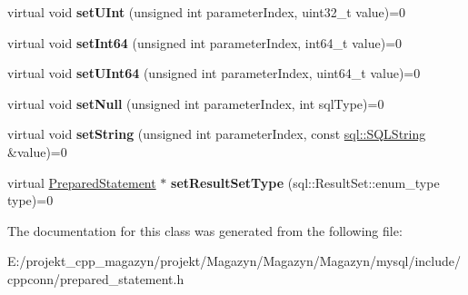 \begin{DoxyCompactItemize}
virtual void {\bfseries set\+U\+Int} (unsigned int parameter\+Index, uint32\+\_\+t value)=0
\item 
\hypertarget{classsql_1_1_prepared_statement_a9c543a18f0e53d669803aab8e84542bd}{}\label{classsql_1_1_prepared_statement_a9c543a18f0e53d669803aab8e84542bd} 
virtual void {\bfseries set\+Int64} (unsigned int parameter\+Index, int64\+\_\+t value)=0
\item 
\hypertarget{classsql_1_1_prepared_statement_a2199c99e837a43a4f2cea85a534c01dd}{}\label{classsql_1_1_prepared_statement_a2199c99e837a43a4f2cea85a534c01dd} 
virtual void {\bfseries set\+U\+Int64} (unsigned int parameter\+Index, uint64\+\_\+t value)=0
\item 
\hypertarget{classsql_1_1_prepared_statement_a06f86fd4e881a9be4ac5292b095ca61e}{}\label{classsql_1_1_prepared_statement_a06f86fd4e881a9be4ac5292b095ca61e} 
virtual void {\bfseries set\+Null} (unsigned int parameter\+Index, int sql\+Type)=0
\item 
\hypertarget{classsql_1_1_prepared_statement_a37812d3749ca13254b913f690bc2ec9f}{}\label{classsql_1_1_prepared_statement_a37812d3749ca13254b913f690bc2ec9f} 
virtual void {\bfseries set\+String} (unsigned int parameter\+Index, const \hyperlink{classsql_1_1_s_q_l_string}{sql\+::\+S\+Q\+L\+String} \&value)=0
\item 
\hypertarget{classsql_1_1_prepared_statement_ab1a76b0a5ffe0c6e4cf380fabad78756}{}\label{classsql_1_1_prepared_statement_ab1a76b0a5ffe0c6e4cf380fabad78756} 
virtual \hyperlink{classsql_1_1_prepared_statement}{Prepared\+Statement} $\ast$ {\bfseries set\+Result\+Set\+Type} (sql\+::\+Result\+Set\+::enum\+\_\+type type)=0
\end{DoxyCompactItemize}


The documentation for this class was generated from the following file\+:\begin{DoxyCompactItemize}
\item 
E\+:/projekt\+\_\+cpp\+\_\+magazyn/projekt/\+Magazyn/\+Magazyn/\+Magazyn/mysql/include/cppconn/prepared\+\_\+statement.\+h\end{DoxyCompactItemize}
